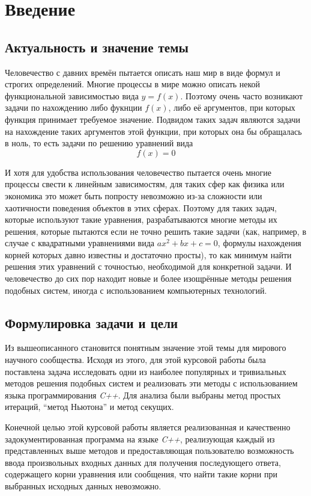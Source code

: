 \section{Введение}
\label{sec:introduction}

\subsection{Актуальность и значение темы}
Человечество с давних времён пытается описать наш мир в виде формул и строгих определений. Многие процессы в мире можно описать некой функциональной зависимостью вида $y=f(x)$. Поэтому очень часто возникают задачи по нахождению либо фукнции $f(x)$, либо её аргументов, при которых функция принимает требуемое значение. Подвидом таких задач являются задачи на нахождение таких аргументов этой функции, при которых она бы обращалась в ноль, то есть задачи по решению уравнений вида
\begin{equation}
	\label{intro:formula_def}
	f(x)=0
\end{equation}

И хотя для удобства использования человечество пытается очень многие процессы свести к линейным зависимостям, для таких сфер как физика или экономика это может быть попросту невозможно из-за сложности или хаотичности поведения объектов в этих сферах. Поэтому для таких задач, которые используют такие уравнения, разрабатываются многие методы их решения, которые пытаются если не точно решить такие задачи (как, например, в случае с квадратными уравнениями вида $ax^2 + bx + c = 0$, формулы нахождения корней которых давно известны и достаточно просты), то как минимум найти решения этих уравнений с точностью, необходимой для конкретной задачи. И человечество до сих пор находит новые и более изощрённые методы решения подобных систем, иногда с использованием компьютерных технологий.

\subsection{Формулировка задачи и цели}
Из вышеописанного становится понятным значение этой темы для мирового научного сообщества. Исходя из этого, для этой курсовой работы была поставлена задача исследовать одни из наиболее популярных и тривиальных методов решения подобных систем и реализовать эти методы с использованием языка программирования \textit{C++}. 
Для анализа были выбраны метод простых итераций, ``метод Ньютона'' и метод секущих.

Конечной целью этой курсовой работы является реализованная и качественно задокументированная программа на языке \textit{C++}, реализующая каждый из представленных выше методов и предоставляющая пользователю возможность ввода произвольных входных данных для получения последующего ответа, содержащего корни уравнения или сообщения, что найти такие корни при выбранных исходных данных невозможно.

